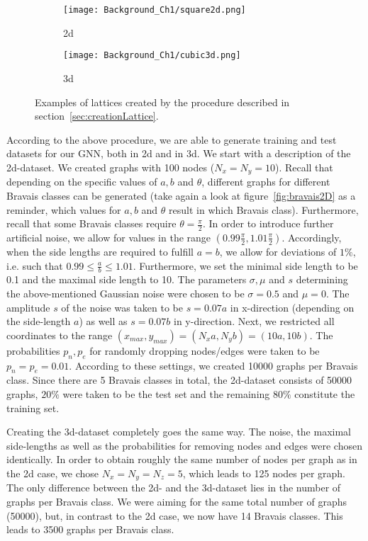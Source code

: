 \begin{figure}
    \centering
    \begin{subfigure}[t]{0.45\textwidth}
        \centering
        \texttt{[image: Background\_Ch1/square2d.png]}
        \caption{2d}
    \end{subfigure}
    \hfill
    \begin{subfigure}[t]{0.45\textwidth}
        \centering
        \texttt{[image: Background\_Ch1/cubic3d.png]}
        \caption{3d}
    \end{subfigure}
    \caption{Examples of lattices created by the procedure described in section~\ref{sec:creationLattice}.}
    \label{fig:examplesLattices}
\end{figure}

According to the above procedure, we are able to generate training and test datasets for our GNN, both in 2d and in 3d.
We start with a description of the 2d-dataset. We created graphs with 100 nodes ($N_x=N_y=10$).
Recall that depending on the specific values of $a,b$ and $\theta$, different graphs for different Bravais classes can be generated 
(take again a look at figure~\ref{fig:bravais2D} as a reminder, which values for $a,b$ and $\theta$ result in which Bravais class).
Furthermore, recall that some Bravais classes require $\theta=\frac{\pi}{2}$. In order to introduce further artificial noise, we allow for values
in the range $(0.99\frac{\pi}{2}, 1.01\frac{\pi}{2})$.
Accordingly, when the side lengths are required to fulfill $a=b$, we allow for deviations of $1\%$, 
i.e. such that $0.99\leq\frac{a}{b}\leq1.01$.
Furthermore, we set the minimal side length to be 0.1 and the maximal side length to 10. 
The parameters $\sigma,\mu$ and $s$ determining the above-mentioned Gaussian noise were chosen to be $\sigma=0.5$ and $\mu=0$. The amplitude $s$ of
the noise was taken to be $s=0.07a$ in x-direction (depending on the side-length $a$) as well as $s=0.07b$
in y-direction. Next, we restricted all coordinates to the range $(x_{max},y_{max})=(N_xa,N_yb)=(10a,10b)$.
The probabilities $p_n,p_e$ for randomly dropping nodes/edges were taken to be $p_n=p_e=0.01$.
According to these settings, we created 10000 graphs per Bravais class. Since there are 5 Bravais classes in total, the
2d-dataset consists of 50000 graphs, $20\%$ were taken to be the test set and the remaining $80\%$ constitute the training set.

Creating the 3d-dataset completely goes the same way. The noise, the maximal side-lengths as well as the probabilities
for removing nodes and edges were chosen identically. In order to obtain roughly the same number of nodes per graph as in the 2d case,
we chose $N_x=N_y=N_z=5$, which leads to 125 nodes per graph.
The only difference between the 2d- and the 3d-dataset lies in the number of graphs per Bravais class. We were aiming
for the same total number of graphs (50000), but, in contrast to the 2d case, we now have 14 Bravais classes.
This leads to 3500 graphs per Bravais class.